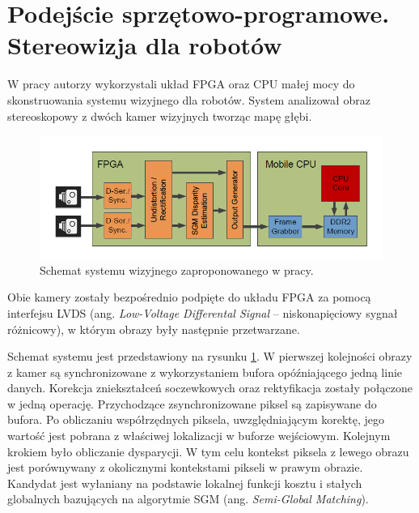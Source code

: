 
\section{Podejście sprzętowo-programowe. Stereowizja dla robotów }

W pracy \cite{honegger2014real} autorzy wykorzystali układ FPGA oraz CPU małej mocy do skonstruowania systemu wizyjnego dla robotów. 
System analizował obraz stereoskopowy z dwóch kamer wizyjnych tworząc mapę głębi. 
\begin{figure}[h]
    \centering
    \includegraphics[width=1\textwidth]{images/honegger2014real_Fig1}
    \caption{Schemat systemu wizyjnego zaproponowanego w pracy\cite{honegger2014real}.}
    \label{fig:honegger2014real_Fig1}
\end{figure}
Obie kamery zostały bezpośrednio podpięte do układu FPGA za pomocą interfejsu LVDS (ang. \textit{Low-Voltage Differental Signal} – niskonapięciowy sygnał różnicowy), w którym obrazy były następnie przetwarzane. 


Schemat systemu jest przedstawiony na rysunku \ref{fig:honegger2014real_Fig1}. W pierwszej kolejności obrazy z kamer są synchronizowane z wykorzystaniem bufora opóźniającego jedną linie danych. 
Korekcja zniekształceń soczewkowych oraz rektyfikacja zostały połączone w jedną operację. Przychodzące zsynchronizowane piksel są zapisywane do bufora. Po obliczaniu współrzędnych piksela, uwzględniającym korektę, jego wartość jest pobrana z właściwej lokalizacji w buforze wejściowym. Kolejnym krokiem było obliczanie dysparycji. W tym celu kontekst piksela z lewego obrazu jest porównywany z okolicznymi kontekstami pikseli w prawym obrazie. Kandydat jest wyłaniany na podstawie lokalnej funkcji kosztu i stałych globalnych bazujących na algorytmie SGM (ang. \textit{Semi-Global Matching}). 

